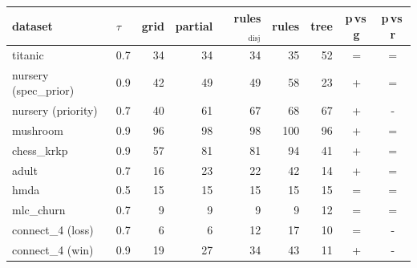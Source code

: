 \begin{tabular}{llrrrrrcc}
\toprule
dataset & $\tau$ & grid & partial & rules$_{\mathrm{disj}}$ & rules & tree & p$\,$vs$\,$g & p$\,$vs$\,$r\\
\midrule
titanic & 0.7 & 34 & 34 & 34 & 35 & 52 & = & =\\
nursery (spec\_prior) & 0.9 & 42 & 49 & 49 & 58 & 23 & + & =\\
nursery (priority) & 0.7 & 40 & 61 & 67 & 68 & 67 & + & -\\
mushroom & 0.9 & 96 & 98 & 98 & 100 & 96 & + & =\\
chess\_krkp & 0.9 & 57 & 81 & 81 & 94 & 41 & + & =\\
adult & 0.7 & 16 & 23 & 22 & 42 & 14 & + & =\\
hmda & 0.5 & 15 & 15 & 15 & 15 & 15 & = & =\\
mlc\_churn & 0.7 & 9 & 9 & 9 & 9 & 12 & = & =\\
connect\_4 (loss) & 0.7 & 6 & 6 & 12 & 17 & 10 & = & -\\
connect\_4 (win) & 0.9 & 19 & 27 & 34 & 43 & 11 & + & -\\
\bottomrule
\end{tabular}

